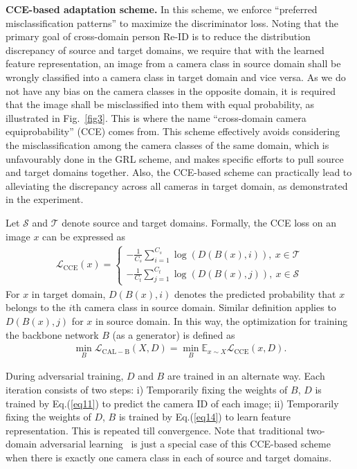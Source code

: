 \documentclass[10pt,twocolumn,letterpaper]{article}
\begin{document}
 
\textbf{CCE-based adaptation scheme.} 
In this scheme, we enforce ``preferred misclassification patterns'' to maximize the discriminator loss. Noting that the primary goal of cross-domain person Re-ID is to reduce the distribution discrepancy of source and target domains, we require that with the learned feature representation, an image from a camera class in source domain shall be wrongly classified into a camera class in target domain and vice versa. 
As we do not have any bias on the camera classes in the opposite domain, it is required that the image shall be misclassified into them with equal probability, as illustrated in Fig.~\ref{fig3}. This is where the name ``cross-domain camera equiprobability'' (CCE) comes from. This scheme effectively avoids considering the misclassification among the camera classes of the same domain, which is unfavourably done in the GRL scheme, and makes specific efforts to pull source and target domains together.
Also, the CCE-based scheme can practically lead to alleviating the discrepancy across all cameras in target domain, as demonstrated in the experiment.




Let ${\mathcal S}$ and ${\mathcal T}$ denote source and target domains. Formally, the CCE loss on an image $x$ can be expressed as
\begin{equation}\label{eq13}
\begin{aligned}
\mathcal{L}_\mathrm{CCE}(x)=\left\{\begin{matrix}
 -\frac{1}{C_{s}}\sum_{i=1}^{C_{s}}\log (D(B(x),i)),~x \in {\mathcal T} \\ 
 -\frac{1}{C_{t}}\sum_{j=1}^{C_{t}}\log (D(B(x),j)),~x \in {\mathcal S}
\end{matrix}\right.
\end{aligned}
\end{equation}
For $x$ in target domain, $D(B(x),i)$ denotes the predicted probability that $x$ belongs to the $i$th camera class in source domain. Similar definition applies to $D(B(x),j)$ for $x$ in source domain. In this way, the optimization for training the backbone network $B$ (as a generator) is defined as
\begin{equation}\label{eq14}
\begin{aligned}
\min_{B}\mathcal{L}_\mathrm{CAL-B}(X, D)=\min_{B}\mathbb{E}_{x\sim X} \mathcal{L}_\mathrm{CCE}(x, D).
 \end{aligned}
\end{equation} 
 
During adversarial training, $D$ and $B$ are trained in an alternate way. Each iteration consists of two steps: i) Temporarily fixing the weights of $B$, $D$ is trained by Eq.(\ref{eq11}) to predict the camera ID of each image; ii) Temporarily fixing the weights of $D$, $B$ is trained by Eq.(\ref{eq14}) to learn feature representation. This is repeated till convergence. Note that traditional two-domain adversarial learning~\cite{DBLP:conf/icml/GaninL15,DBLP:conf/cvpr/TzengHSD17} is just a special case of this CCE-based scheme when there is exactly one camera class in each of source and target domains.
\end{document}
